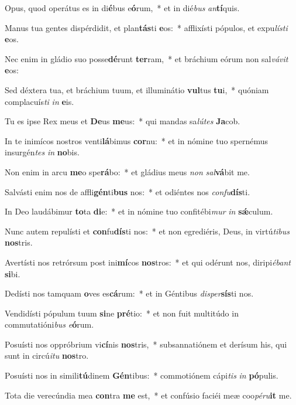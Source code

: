 \item Opus, quod operátus es in di\textbf{é}bus e\textbf{ó}rum,~* et in dié\textit{bus} \textit{an}\textbf{tí}quis.
\item Manus tua gentes dispérdidit, et plan\textbf{tás}ti \textbf{e}os:~* afflixísti pópulos, et expu\textit{lís}\textit{ti} \textbf{e}os.
\item Nec enim in gládio suo posse\textbf{dé}runt \textbf{ter}ram,~* et bráchium eórum non sal\textit{vá}\textit{vit} \textbf{e}os:
\item Sed déxtera tua, et bráchium tuum, et illuminátio \textbf{vul}tus \textbf{tu}i,~* quóniam complacuís\textit{ti} \textit{in} \textbf{e}is.
\item Tu es ipse Rex meus et \textbf{De}us \textbf{me}us:~* qui mandas sa\textit{lú}\textit{tes} \textbf{Ja}cob.
\item In te inimícos nostros venti\textbf{lá}bimus \textbf{cor}nu:~* et in nómine tuo spernémus insurgén\textit{tes} \textit{in} \textbf{no}bis.
\item Non enim in arcu \textbf{me}o spe\textbf{rá}bo:~* et gládius meus \textit{non} \textit{sal}\textbf{vá}bit me.
\item Salvásti enim nos de affli\textbf{gén}ti\textbf{bus} nos:~* et odiéntes nos \textit{con}\textit{fu}\textbf{dís}ti.
\item In Deo laudábimur \textbf{to}ta \textbf{di}e:~* et in nómine tuo confitébi\textit{mur} \textit{in} \textbf{sǽ}culum.
\item Nunc autem repulísti et \textbf{con}fu\textbf{dís}ti nos:~* et non egrediéris, Deus, in virtú\textit{ti}\textit{bus} \textbf{nos}tris.
\item Avertísti nos retrórsum post ini\textbf{mí}cos \textbf{nos}tros:~* et qui odérunt nos, diripi\textit{é}\textit{bant} \textbf{si}bi.
\item Dedísti nos tamquam \textbf{o}ves es\textbf{cá}rum:~* et in Géntibus \textit{di}\textit{sper}\textbf{sís}ti nos.
\item Vendidísti pópulum tuum \textbf{si}ne \textbf{pré}tio:~* et non fuit multitúdo in commutatióni\textit{bus} \textit{e}\textbf{ó}rum.
\item Posuísti nos oppróbrium vi\textbf{cí}nis \textbf{nos}tris,~* subsannatiónem et derísum his, qui sunt in circú\textit{i}\textit{tu} \textbf{nos}tro.
\item Posuísti nos in simili\textbf{tú}dinem \textbf{Gén}tibus:~* commotiónem cápi\textit{tis} \textit{in} \textbf{pó}pulis.
\item Tota die verecúndia mea \textbf{con}tra \textbf{me} est,~* et confúsio faciéi meæ coo\textit{pé}\textit{ru}\textbf{it} me.
